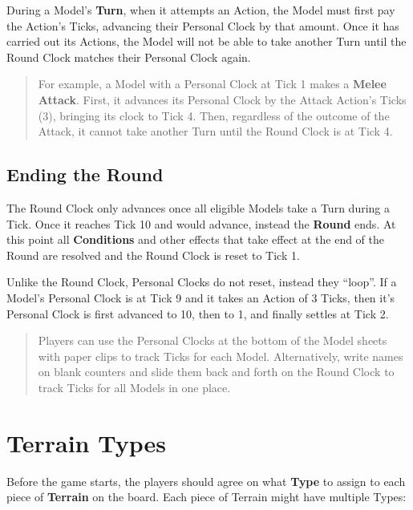 \documentclass[
]{book}
\begin{document}
During a Model's \textbf{Turn}, when it attempts an Action, the Model must first pay the Action's Ticks, advancing their Personal Clock by that amount. Once it has carried out its Actions, the Model will not be able to take another Turn until the Round Clock matches their Personal Clock again.

\begin{quote}
For example, a Model with a Personal Clock at Tick 1 makes a \textbf{Melee Attack}. First, it advances its Personal Clock by the Attack Action's Ticks (3), bringing its clock to Tick 4. Then, regardless of the outcome of the Attack, it cannot take another Turn until the Round Clock is at Tick 4.
\end{quote}

\hypertarget{ending-the-round}{%
\subsection*{Ending the Round}\label{ending-the-round}}

The Round Clock only advances once all eligible Models take a Turn during a Tick. Once it reaches Tick 10 and would advance, instead the \textbf{Round} ends. At this point all \textbf{Conditions} and other effects that take effect at the end of the Round are resolved and the Round Clock is reset to Tick 1.

Unlike the Round Clock, Personal Clocks do not reset, instead they ``loop''. If a Model's Personal Clock is at Tick 9 and it takes an Action of 3 Ticks, then it's Personal Clock is first advanced to 10, then to 1, and finally settles at Tick 2.

\begin{quote}
Players can use the Personal Clocks at the bottom of the Model sheets with paper clips to track Ticks for each Model. Alternatively, write names on blank counters and slide them back and forth on the Round Clock to track Ticks for all Models in one place.
\end{quote}

\hypertarget{terrain}{%
\section{Terrain Types}\label{terrain}}

Before the game starts, the players should agree on what \textbf{Type} to assign to each piece of \textbf{Terrain} on the board. Each piece of Terrain might have multiple Types:
\end{document}
